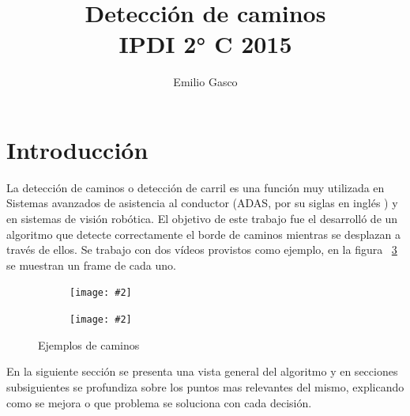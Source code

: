 \documentclass[a4paper,spanish]{article}
\title{Detección de caminos \\ IPDI 2° C 2015}
\author{Emilio Gasco}
\begin{document}
\maketitle

\newcommand{\myss}[3]{
    \begin{subfigure}[b]{#1\textwidth}
        \texttt{[image: \#2]}
        \caption{#3}
        \label{fig:#2}
    \end{subfigure}
}
\newcommand{\CALL}[2]{
	\it{#1}$($#2$)$
}
\newcommand{\Null}{\textbf{\textit{Null}}$ $}
\newcommand{\IS}{\textbf{\textit{is}}$ $}
\newcommand{\ALL}{\textbf{\textit{all}}$ $}
\newcommand{\IN}{\textbf{\textit{in}}$ $}
\newcommand{\FROM}{\textbf{\textit{from}}$ $}
\newcommand{\UNTIL}{\textbf{\textit{until}}$ $}


\section{Introducción}

La detección de caminos o detección de carril es una función muy utilizada en Sistemas avanzados de asistencia al conductor (ADAS, por su siglas en inglés ) y en sistemas de visión robótica. El objetivo de este trabajo fue el desarrolló de un algoritmo que detecte correctamente el borde de caminos mientras se desplazan a través de ellos. Se trabajo con dos vídeos provistos como ejemplo, en la figura ~\ref{fig:ejemplo} se muestran un frame de cada uno.
\begin{figure}[h]
\begin{center}
\myss{0.4}{ejemplos/frame_132}{}
\myss{0.4}{ejemplos/frame_495}{}
\caption{Ejemplos de caminos}
\label{fig:ejemplo}
\end{center}
\end{figure}
	En la siguiente sección se presenta una vista general del algoritmo y en secciones subsiguientes se profundiza sobre los puntos  mas relevantes del mismo, explicando como se mejora o que problema se soluciona con cada decisión. 
    
\end{document}
